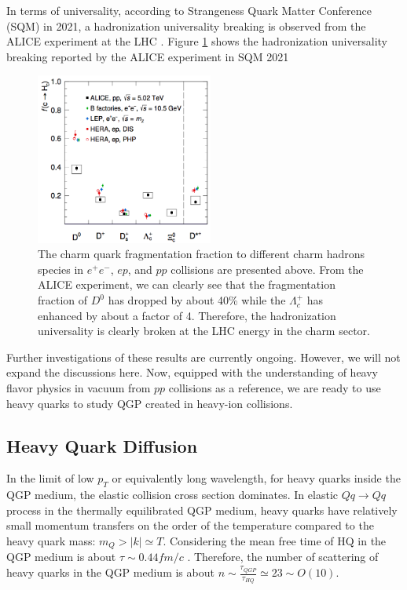 In terms of universality, according to Strangeness Quark Matter Conference (SQM) in 2021, a hadronization universality breaking is observed from the ALICE experiment at the LHC \cite{GMISQM}. Figure \ref{CharmFFALICE} shows the hadronization universality breaking reported by the ALICE experiment in SQM 2021

 \begin{figure}[hbtp]
\begin{center}
\includegraphics[width=0.52\textwidth]{Figures/Chapter1/ALICECharmFF.png}
\caption{The charm quark fragmentation fraction to different charm hadrons species in $e^+e^-$, $ep$, and $pp$ collisions are presented above. From the ALICE experiment, we can clearly see that the fragmentation fraction of $D^0$ has dropped by about 40\% while the $\Lambda_c^+$ has enhanced by about a factor of 4. Therefore, the hadronization universality is clearly broken at the LHC energy in the charm sector.}
\label{CharmFFALICE} 
\end{center}
\end{figure}   

Further investigations of these results are currently ongoing. However, we will not expand the discussions here. Now, equipped with the understanding of heavy flavor physics in vacuum from $pp$ collisions as a reference, we are ready to use heavy quarks to study QGP created in heavy-ion collisions. 

\subsection{Heavy Quark Diffusion}

In the limit of low $p_T$ or equivalently long wavelength, for heavy quarks inside the QGP medium, the elastic collision cross section dominates. In elastic $Q q \rightarrow Q q$ process in the thermally equilibrated QGP medium, heavy quarks have relatively small momentum transfers on the order of the temperature compared to the heavy quark mass: $m_Q > |k| \simeq T$. Considering the mean free time of HQ in the QGP medium is about $\tau \sim 0.44 fm/c$ \cite{HQTau}. Therefore, the number of scattering of heavy quarks in the QGP medium is about $n \sim \frac{\tau_{QGP}}{\tau_{HQ}} \simeq 23 \sim O(10)$.

